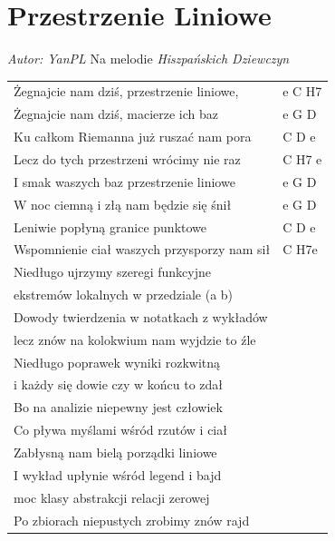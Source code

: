 \documentclass[11pt]{mwrep}
\renewcommand{\[}{\begin{equation}}
\renewcommand{\]}{\end{equation}}
\begin{document}
\section*{Przestrzenie Liniowe}
\textit{Autor: YanPL} Na melodie \textit{Hiszpańskich Dziewczyn}  \par\nopagebreak
{\begin{tabular}{ll}
{Żegnajcie nam dziś, przestrzenie} liniowe,	  &  e C H7 \\ 
Żegnajcie nam dziś, macierze ich baz				  &  e G D \\ 
Ku całkom Riemanna już ruszać nam pora				  &  C D e \\ 
Lecz do tych przestrzeni wrócimy nie raz			  &  C H7 e \vspace{0.8eM}\\ 

		{I smak waszych baz przestrzenie} liniowe		  &  e G D \\ 
		W noc ciemną i złą nam będzie się śnił		  &  e G D \\ 
		Leniwie popłyną granice punktowe			  &  C D e \\ 
		Wspomnienie ciał waszych przysporzy nam sił	  &  C H7e \vspace{0.8eM}\\ 

Niedługo ujrzymy szeregi funkcyjne \\ 
ekstremów lokalnych w przedziale (a b) \\ 
Dowody twierdzenia w notatkach z wykładów \\ 
lecz znów na kolokwium nam wyjdzie to źle \vspace{0.8eM}\\ 

Niedługo poprawek wyniki rozkwitną \\ 
i każdy się dowie czy w końcu to zdał \\ 
Bo na analizie niepewny jest człowiek \\ 
Co pływa myślami wśród rzutów i ciał \vspace{0.8eM}\\ 

Zabłysną nam bielą porządki liniowe \\ 
I wykład upłynie wśród legend i bajd \\ 
moc klasy abstrakcji relacji zerowej \\ 
Po zbiorach niepustych zrobimy znów rajd \vspace{0.8eM}\\ 


\end{tabular}}
\end{document}

